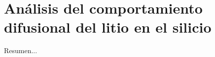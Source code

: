\chapter{Análisis del comportamiento difusional del litio en el silicio}\label{ch:comportamiento}
\thispagestyle{empty}

\vspace{50pt}

\begin{adjustwidth}{50pt}{50pt}
    Resumen...
\end{adjustwidth}

\clearpage
\newpage
\thispagestyle{empty}
\mbox{}
\newpage


